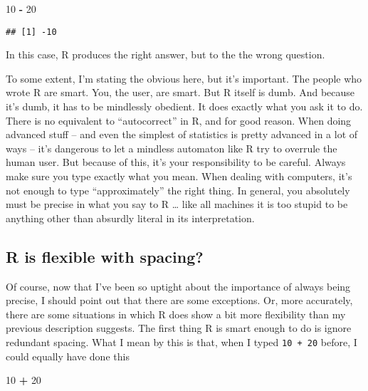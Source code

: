 \documentclass[]{book}
\newenvironment{Shaded}{\begin{snugshade}}{\end{snugshade}}
\newcommand{\DecValTok}[1]{\textcolor[rgb]{0.00,0.00,0.81}{#1}}
\newcommand{\OperatorTok}[1]{\textcolor[rgb]{0.81,0.36,0.00}{\textbf{#1}}}
\newcommand{\StringTok}[1]{\textcolor[rgb]{0.31,0.60,0.02}{#1}}
\begin{document}
\begin{Shaded}
\begin{Highlighting}[]
\DecValTok{10} \OperatorTok{-}\StringTok{ }\DecValTok{20}
\end{Highlighting}
\end{Shaded}

\begin{verbatim}
## [1] -10
\end{verbatim}

In this case, R produces the right answer, but to the the wrong question.

To some extent, I'm stating the obvious here, but it's important. The people who wrote R are smart. You, the user, are smart. But R itself is dumb. And because it's dumb, it has to be mindlessly obedient. It does exactly what you ask it to do. There is no equivalent to ``autocorrect'' in R, and for good reason. When doing advanced stuff -- and even the simplest of statistics is pretty advanced in a lot of ways -- it's dangerous to let a mindless automaton like R try to overrule the human user. But because of this, it's your responsibility to be careful. Always make sure you type exactly what you mean. When dealing with computers, it's not enough to type ``approximately'' the right thing. In general, you absolutely must be precise in what you say to R \ldots{} like all machines it is too stupid to be anything other than absurdly literal in its interpretation.

\hypertarget{r-is-flexible-with-spacing}{%
\subsection{R is flexible with spacing?}\label{r-is-flexible-with-spacing}}

Of course, now that I've been so uptight about the importance of always being precise, I should point out that there are some exceptions. Or, more accurately, there are some situations in which R does show a bit more flexibility than my previous description suggests. The first thing R is smart enough to do is ignore redundant spacing. What I mean by this is that, when I typed \texttt{10\ +\ 20} before, I could equally have done this

\begin{Shaded}
\begin{Highlighting}[]
\DecValTok{10}        \OperatorTok{+}\StringTok{ }\DecValTok{20}
\end{Highlighting}
\end{Shaded}
\end{document}
